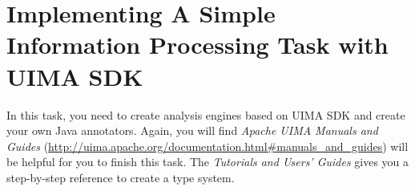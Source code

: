 
\chapter{Implementing A Simple Information Processing Task with UIMA SDK}

In this task, you need to create analysis engines based on UIMA SDK and create
your own Java annotators. Again, you will find \emph{Apache UIMA Manuals and
Guides} (\url{http://uima.apache.org/documentation.html#manuals_and_guides})
will be helpful for you to finish this task. The \emph{Tutorials and Users'
Guides} gives you a step-by-step reference to create a type system.






